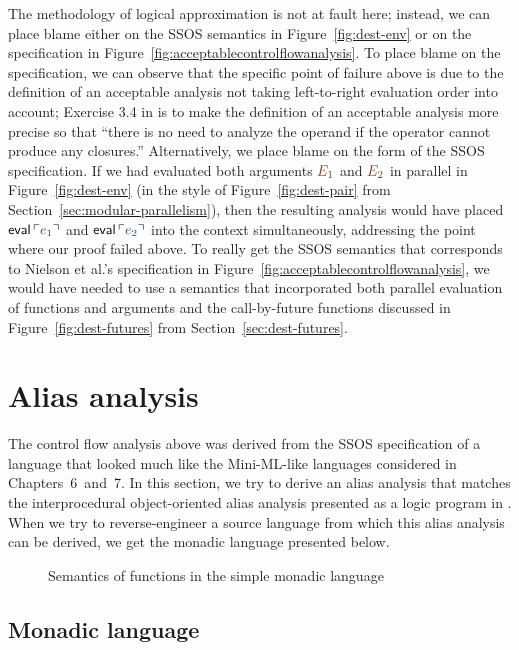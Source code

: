 The methodology of logical approximation is not at fault here;
instead, we can place blame either on the SSOS semantics in
Figure~\ref{fig:dest-env} or on the specification in
Figure~\ref{fig:acceptablecontrolflowanalysis}. To place blame on the
specification, we can observe that the specific point of failure above
is due to the definition of an acceptable analysis not taking
left-to-right evaluation order into account; Exercise 3.4 in
\cite{nielson05principles} is to make the definition of an acceptable
analysis more precise so that ``there is no need to analyze the
operand if the operator cannot produce any closures.'' Alternatively,
we place blame on the form of the SSOS specification. If we had
evaluated both arguments $\lf{E_1}$ and $\lf{E_2}$ in parallel in
Figure~\ref{fig:dest-env} (in the style of Figure~\ref{fig:dest-pair}
from Section~\ref{sec:modular-parallelism}), then the resulting
analysis would have placed ${\sf eval}\,\interp{e_1}$ and ${\sf
  eval}\,\interp{e_2}$ into the context simultaneously, addressing the
point where our proof failed above. To really get the SSOS semantics
that corresponds to Nielson et al.'s specification in
Figure~\ref{fig:acceptablecontrolflowanalysis}, we would have needed
to use a semantics that incorporated both parallel evaluation of
functions and arguments and the call-by-future functions discussed
in Figure~\ref{fig:dest-futures} from Section~\ref{sec:dest-futures}.

\section{Alias analysis}
\label{sec:aliasanalysis}

The control flow analysis above was derived from the SSOS
specification of a language that looked much like the Mini-ML-like
languages considered in Chapters~6~and~7.  In this section, we try to
derive an alias analysis that matches the interprocedural
object-oriented alias analysis presented as a logic program in
\cite[Chapter 12.4]{aho07compilers}.  When we try to reverse-engineer
a source language from which this alias analysis can be derived, we
get the monadic language presented below.

\begin{figure}
\caption{Semantics of functions in the simple monadic language}
\label{fig:ssos-monadic}
\end{figure}

\subsection{Monadic language}

